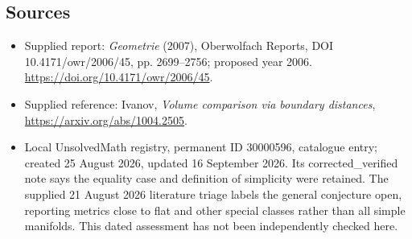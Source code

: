 \documentclass[11pt]{article}
\begin{document}
\subsection{Sources}
\begin{itemize}
\item Supplied report: \emph{Geometrie} (2007), Oberwolfach Reports, DOI 10.4171/owr/2006/45, pp. 2699--2756; proposed year 2006. \url{https://doi.org/10.4171/owr/2006/45}.
\item Supplied reference: Ivanov, \emph{Volume comparison via boundary distances}, \url{https://arxiv.org/abs/1004.2505}.
\item Local UnsolvedMath registry, permanent ID 30000596, catalogue entry; created 25 August 2026, updated 16 September 2026. Its corrected\_verified note says the equality case and definition of simplicity were retained. The supplied 21 August 2026 literature triage labels the general conjecture open, reporting metrics close to flat and other special classes rather than all simple manifolds. This dated assessment has not been independently checked here.
\end{itemize}
\end{document}
